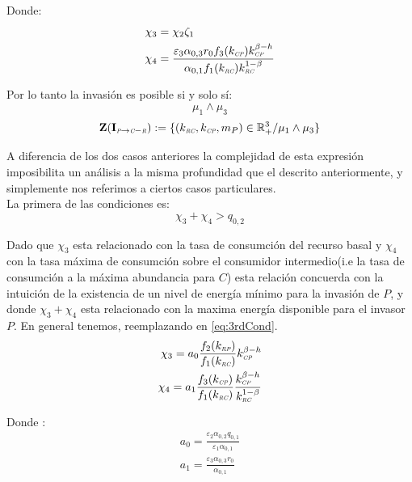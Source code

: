 Donde:
\begin{equation}\label{eq:3rdCond}
  \begin{aligned}
    \chi_3 &= \chi_2 \zeta_1 \\
    \chi_4 &= \frac{\varepsilon_3 \alpha_{0,3}r_0 f_3(k_{\textit{\tiny CP}})k_{\textit{\tiny CP}}^{\beta - h}}{\alpha_{0,1}f_1(k_{\textit{\tiny RC}})k_{\textit{\tiny RC}}^{1-\beta}}
  \end{aligned}
\end{equation}

Por lo tanto la invasi\'on es posible si y solo s\'i:
\begin{equation}
  \mu_1 \land \mu_3
\end{equation}
\begin{equation}
\mathbf{Z(I_{\textit{\tiny P} \to \textit{\tiny C}-\textit{\tiny R}})} := \{ (k_{\textit{\tiny RC}},k_{\textit{\tiny CP}},m_P) \in \mathbb{R}^3_+ / \mu_1 \land \mu_3 \}
\end{equation}

A diferencia de los dos casos anteriores la complejidad de esta expresi\'on imposibilita un an\'alisis a la misma profundidad que el descrito anteriormente, y simplemente nos referimos a ciertos casos particulares.\\

La primera de las condiciones es:
\begin{equation}
  \chi_3 + \chi_4 > q_{0,2}
\end{equation}

Dado que $\chi_3$ esta relacionado con la tasa de consumci\'on del recurso basal y $\chi_4$ con la tasa m\'axima de consumci\'on sobre el consumidor intermedio(i.e la tasa de consumci\'on a la m\'axima abundancia para $C$) esta relaci\'on concuerda con la intuici\'on de la existencia de un nivel de energ\'ia m\'inimo para la invasi\'on de $P$, y donde $\chi_3 + \chi_4$ esta relacionado con la maxima energ\'ia disponible para el invasor $P$.
En general tenemos, reemplazando en \eqref{eq:3rdCond}.
\begin{equation}
  \begin{aligned}
    \chi_3 = a_0 \frac{f_2(k_{\textit{\tiny RP}})}{f_1(k_{\textit{\tiny RC}})} k_{\textit{\tiny CP}}^{\beta-h} \\
    \chi_4 = a_1 \frac{f_3(k_{\textit{\tiny CP}})}{f_1(k_{\textit{\tiny RC}})} \frac{k_{\textit{\tiny CP}}^{\beta - h}}{k_{\textit{\tiny RC}}^{1-\beta}}
  \end{aligned}
\end{equation}

Donde :
\begin{equation}
  \begin{aligned}
    a_0 = \frac{\varepsilon_2 \alpha_{0,2} q_{0,1}}{\varepsilon_1 \alpha_{0,1}} \\
    a_1 = \frac{\varepsilon_3 \alpha_{0,3} r_0}{\alpha_{0,1}}
  \end{aligned}
\end{equation}

